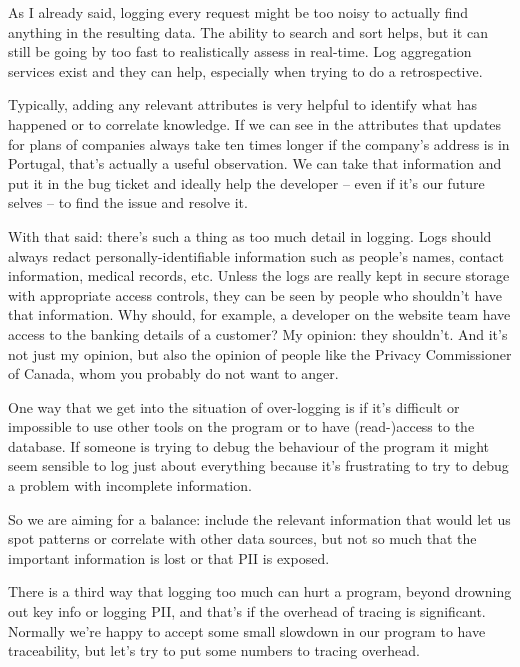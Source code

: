 As I already said, logging every request might be too noisy to actually find anything in the resulting data. The ability to search and sort helps, but it can still be going by too fast to realistically assess in real-time. Log aggregation services exist and they can help, especially when trying to do a retrospective.

Typically, adding any relevant attributes is very helpful to identify what has happened or to correlate knowledge. If we can see in the attributes that updates for plans of companies always take ten times longer if the company's address is in Portugal, that's actually a useful observation. We can take that information and put it in the bug ticket and ideally help the developer -- even if it's our future selves -- to find the issue and resolve it.

With that said: there's such a thing as too much detail in logging. Logs should always redact personally-identifiable information such as people's names, contact information, medical records, etc. Unless the logs are really kept in secure storage with appropriate access controls, they can be seen by people who shouldn't have that information. Why should, for example, a developer on the website team have access to the banking details of a customer? My opinion: they shouldn't. And it's not just my opinion, but also the opinion of people like the Privacy Commissioner of Canada, whom you probably do not want to anger.

One way that we get into the situation of over-logging is if it's difficult or impossible to use other tools on the program or to have (read-)access to the database. If someone is trying to debug the behaviour of the program it might seem sensible to log just about everything because it's frustrating to try to debug a problem with incomplete information. 

So we are aiming for a balance: include the relevant information that would let us spot patterns or correlate with other data sources, but not so much that the important information is lost or that PII is exposed.

There is a third way that logging too much can hurt a program, beyond drowning out key info or logging PII, and that's if the overhead of tracing is significant. Normally we're happy to accept some small slowdown in our program to have traceability, but let's try to put some numbers to tracing overhead. 

